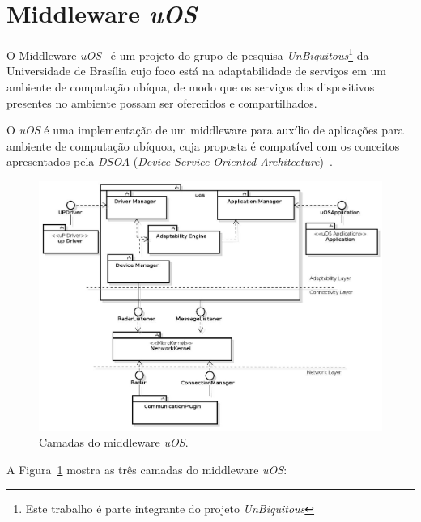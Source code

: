 \section{Middleware \textit{uOS}}
\label{uos}

	O Middleware \textit{uOS}~\cite{fabriciobuzzeto} é um projeto do grupo de pesquisa \textit{UnBiquitous}\footnote{Este trabalho é parte integrante do projeto \textit{UnBiquitous}} da Universidade de Brasília cujo foco está na adaptabilidade de serviços em um ambiente de computação ubíqua, de modo que os serviços dos dispositivos presentes no ambiente possam ser oferecidos e compartilhados.

	 O \textit{uOS} é uma implementação de um middleware para auxílio de aplicações para ambiente de computação ubíquoa, cuja proposta é compatível com os conceitos apresentados pela \textit{DSOA} (\textit{Device Service Oriented Architecture})~\cite{fabriciobuzzeto}. 

	 \begin{figure}[htb]
		\begin{center}
			\includegraphics[scale=0.45]{figuras/4.ProblemaEProposta/uoscamadas.jpg}
		\end{center}
		\caption{Camadas do middleware \textit{uOS}.}
		\label{fig:arq-uos}
	\end{figure}

	A Figura~\ref{fig:arq-uos} mostra as três camadas do middleware \textit{uOS}:


